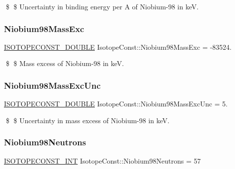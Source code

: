 \$ \$ Uncertainty in binding energy per A of Niobium-\/98 in keV. \mbox{\label{group___isotope_const-_niobium-_nb98_ga3c4eae82d53fa1082989f5f533fb8bb8}} 
\subsubsection{\texorpdfstring{Niobium98\+Mass\+Exc}{Niobium98MassExc}}
{\footnotesize\ttfamily \mbox{\hyperlink{group___isotope_const-_macros_ga8f45a7272ce02c0b4c65c44636ed719a}{I\+S\+O\+T\+O\+P\+E\+C\+O\+N\+S\+T\+\_\+\+D\+O\+U\+B\+LE}} Isotope\+Const\+::\+Niobium98\+Mass\+Exc = -\/83524.}

\$ \$ Mass excess of Niobium-\/98 in keV. \mbox{\label{group___isotope_const-_niobium-_nb98_gada091a827ca6f1d9ccf2d175dbd4cf65}} 
\subsubsection{\texorpdfstring{Niobium98\+Mass\+Exc\+Unc}{Niobium98MassExcUnc}}
{\footnotesize\ttfamily \mbox{\hyperlink{group___isotope_const-_macros_ga8f45a7272ce02c0b4c65c44636ed719a}{I\+S\+O\+T\+O\+P\+E\+C\+O\+N\+S\+T\+\_\+\+D\+O\+U\+B\+LE}} Isotope\+Const\+::\+Niobium98\+Mass\+Exc\+Unc = 5.}

\$ \$ Uncertainty in mass excess of Niobium-\/98 in keV. \mbox{\label{group___isotope_const-_niobium-_nb98_ga32f8fb4f8e820fb26f1d057b6733e073}} 
\subsubsection{\texorpdfstring{Niobium98\+Neutrons}{Niobium98Neutrons}}
{\footnotesize\ttfamily \mbox{\hyperlink{group___isotope_const-_macros_ga5f18360b3e99483a35c32d789e62621c}{I\+S\+O\+T\+O\+P\+E\+C\+O\+N\+S\+T\+\_\+\+I\+NT}} Isotope\+Const\+::\+Niobium98\+Neutrons = 57}

